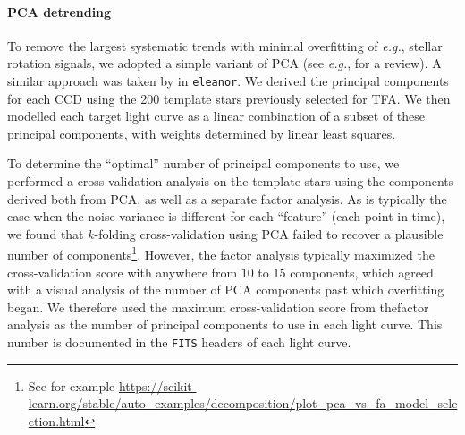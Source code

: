 \documentclass[12pt,twocolumn,tighten]{aastex62}
\begin{document}
\paragraph{PCA detrending}

To remove the largest systematic trends with minimal overfitting of
{\it e.g.}, stellar rotation signals, we adopted a simple variant of PCA
(see {\it e.g.}, \citealt{ivezic_statistics_2014} for a review).  A similar
approach was taken by \citet{feinstein_eleanor_2019} in
\texttt{eleanor}.  We derived the principal components for each CCD
using the 200 template stars previously selected for TFA.
We then modelled each target light curve as a linear combination of a
subset of these principal components, with weights determined by
linear least squares.

To determine the ``optimal'' number of principal components to use, we
performed a cross-validation analysis on the template stars using the
components derived both from PCA, as well as a separate factor
analysis.  As is typically the case when the noise variance is
different for each ``feature'' (each point in time), we found that
$k$-folding cross-validation using PCA failed to recover a plausible
number of components\footnote{See for example
\url{https://scikit-learn.org/stable/auto_examples/decomposition/plot_pca_vs_fa_model_selection.html}}.
However, the factor analysis typically maximized the cross-validation
score with anywhere from $10$ to $15$ components, which agreed with a
visual analysis of the number of PCA components past which overfitting
began.  We therefore used the maximum cross-validation score 
from thefactor analysis
as the number of principal components to use in each light curve.
This number is
documented in the \texttt{FITS} headers of each light curve.

% 
\end{document}
